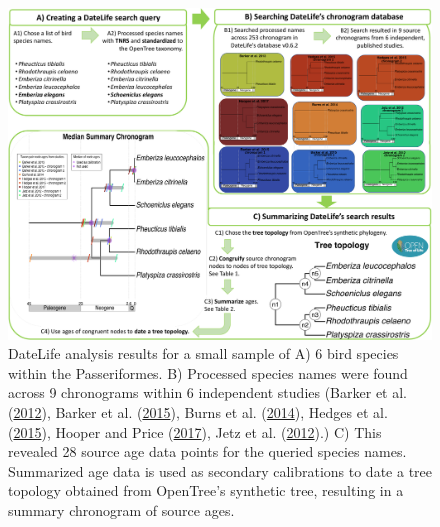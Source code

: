 \documentclass[
  english,
  man]{apa6}
\begin{document}
\begin{figure}[!h]
\includegraphics[width=1\linewidth]{../figures/figure2/figure2.pdf}
\caption{DateLife analysis results for a small sample of A) 6 bird species within the Passeriformes. B) Processed species names were found across 9 chronograms within 6 independent studies (Barker et al. (\protect\hyperlink{ref-barker2012going}{2012}), Barker et al. (\protect\hyperlink{ref-barker2015new}{2015}), Burns et al. (\protect\hyperlink{ref-burns2014phylogenetics}{2014}), Hedges et al. (\protect\hyperlink{ref-Hedges2015}{2015}), Hooper and Price (\protect\hyperlink{ref-hooper2017chromosomal}{2017}), Jetz et al. (\protect\hyperlink{ref-Jetz2012}{2012}).) C) This revealed 28 source age data points for the queried species names. Summarized age data is used as secondary calibrations to date a tree topology obtained from OpenTree's synthetic tree, resulting in a summary chronogram of source ages.}
\label{fig:figure2}
\end{figure}
\end{document}
